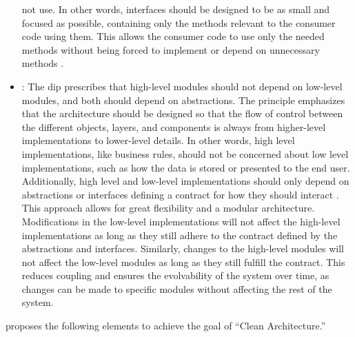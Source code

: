 \begin{itemize}
    not use. In other words, interfaces should be designed to be as small and focused as
    possible, containing only the methods relevant to the consumer code using them. This
    allows the consumer code to use only the needed methods without being forced to
    implement or depend on unnecessary methods
    \parencite[104]{r_c_martin_clean_2018}. 
    \item {}: The \gls{dip} prescribes that high-level modules should not
    depend on low-level modules, and both should depend on abstractions. The principle
    emphasizes that the architecture should be designed so that the flow of control
    between the different objects, layers, and components is always from higher-level
    implementations to lower-level details. In other words, high level implementations,
    like business rules, should not be concerned about low level implementations, such as
    how the data is stored or presented to the end user. Additionally, high level and
    low-level implementations should only depend on abstractions or interfaces defining a
    contract for how they should interact \parencite[91]{r_c_martin_clean_2018}. This
    approach allows for great flexibility and a modular architecture. Modifications in the
    low-level implementations will not affect the high-level implementations as long as
    they still adhere to the contract defined by the abstractions and interfaces.
    Similarly, changes to the high-level modules will not affect the low-level modules as
    long as they still fulfill the contract. This reduces coupling and ensures the
    evolvability of the system over time, as changes can be made to specific modules
    without affecting the rest of the system.
\end{itemize}

\textcite{r_c_martin_clean_2018} proposes the following elements to achieve
the goal of \enquote{Clean Architecture.}

